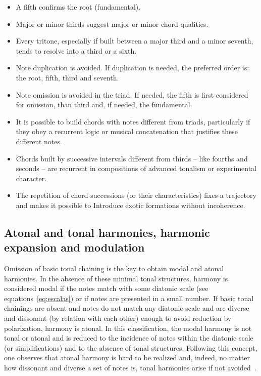 \begin{itemize}
        \item A fifth confirms the root (fundamental).
        \item Major or minor thirds suggest major or minor chord qualities.
        \item Every tritone, especially if built between a major third and a minor seventh, tends to resolve into a third or a sixth.
        \item Note duplication is avoided. If duplication is needed, the preferred order is: the root, fifth, third and seventh.
        \item Note omission is avoided in the triad. If needed, the fifth is first considered for omission, than third and, if needed, the fundamental.
        \item It is possible to build chords with notes different from triads, particularly if they obey a recurrent logic or musical concatenation that justifies these different notes.
        \item Chords built by successive intervals different from thirds – like fourths and seconds -- are recurrent in compositions of advanced tonalism or experimental character.
        \item The repetition of chord successions (or their characteristics) fixes a trajectory and makes it possible to 
Introduce exotic formations without incoherence.
\end{itemize}



\subsection{Atonal and tonal harmonies, harmonic expansion and modulation}\label{subsec:harmonia}

Omission of basic tonal chaining is the key to obtain modal and atonal harmonies. In the absence of these minimal tonal structures, 
harmony is considered modal if the notes match with some diatonic scale (see equations~\ref{eq:escalas}) or if notes are presented in a small number. If basic tonal chainings are absent and notes do not match any diatonic scale and are diverse and dissonant (by relation with each other) enough to avoid reduction by polarization, harmony is atonal. In this classification, the modal harmony is not tonal or atonal and is reduced to the incidence of notes within the diatonic scale (or simplifications) and to the absence of tonal structures. Following this concept, one observes that atonal harmony is hard to be realized and, indeed, no matter how dissonant and diverse
a set of notes is, tonal harmonies arise if not avoided~\cite{harmEXT}.

